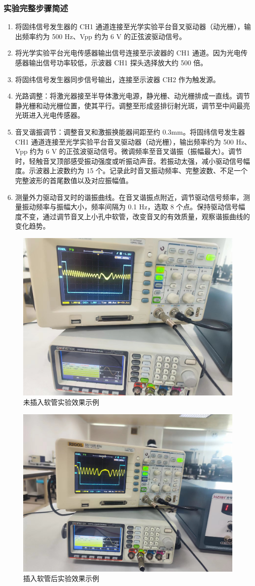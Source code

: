 \documentclass[dvipsnames, svgnames,a4paper,11pt]{article}
\begin{document}
	\subsubsection{实验完整步骤简述}
	\begin{enumerate}
		\item 将固纬信号发生器的 CH1 通道连接至光学实验平台音叉驱动器（动光栅），输出频率约为 500 Hz、Vpp 约为 6 V 的正弦波驱动信号。
		
		\item 将光学实验平台光电传感器输出信号连接至示波器的 CH1 通道。因为光电传感器输出信号功率较低，示波器 CH1 探头选择放大约 500 倍。
		
		\item 将固纬信号发生器同步信号输出，连接至示波器 CH2 作为触发源。

		
		\item 光路调整：将激光器接至半导体激光电源，静光栅、动光栅排成一直线。调节静光栅和动光栅位置，使其平行。调整至形成竖排衍射光斑，调节至中间最亮光斑进入光电传感器。
		
		\item 音叉谐振调节：调整音叉和激振换能器间距至约 0.3mm。将固纬信号发生器 CH1 通道连接至光学实验平台音叉驱动器（动光栅），输出频率约为 500 Hz、Vpp 约为 6 V 的正弦波驱动信号。微调频率至音叉谐振（振幅最大）。调节时，轻触音叉顶部感受振动强度或听振动声音。若振动太强，减小驱动信号幅度。示波器上波数约为 15 个。记录此时音叉振动频率、完整波数、不足一个完整波形的首尾数值以及对应振幅值。
		
		\item 测量外力驱动音叉时的谐振曲线。在音叉谐振点附近，调节驱动信号频率，测量振动频率与振幅大小，频率间隔为 0.1 Hz，选取 8 个点。保持驱动信号幅度不变，通过调节音叉上小孔中软管，改变音叉的有效质量，观察谐振曲线的变化趋势。
	\end{enumerate}
	\begin{figure}[H]
		\centering
		\includegraphics[width=0.4\linewidth]{images/实验剪影1}
		\caption{未插入软管实验效果示例}
		\label{实验剪影1}
	\end{figure}
	\begin{figure}[H]
		\centering
		\includegraphics[width=0.4\linewidth]{images/实验剪影2}
		\caption{插入软管后实验效果示例}
		\label{实验剪影2}
	\end{figure}
\end{document}
